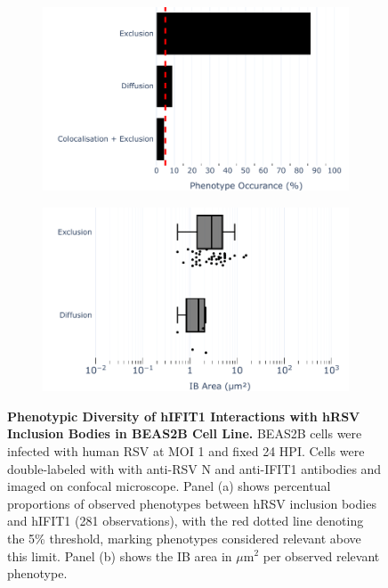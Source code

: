 \begin{figure}
    \begin{subfigure}{0.495\textwidth}
        \caption{}
        \includegraphics[width=1\linewidth]{08. Chapter 3/Figs/02. Infection/01. IFIT1/04. bar_i1_beas2b.pdf} 
    \end{subfigure}
    \begin{subfigure}{0.495\textwidth}
        \caption{}
        \includegraphics[width=1\linewidth]{08. Chapter 3/Figs/02. Infection/01. IFIT1/05. box_i1_beas2b.pdf}
    \end{subfigure}
    \caption[Phenotypic Diversity of hIFIT1 Interactions with hRSV Inclusion Bodies in BEAS2B Cell Line.]{\textbf{Phenotypic Diversity of hIFIT1 Interactions with hRSV Inclusion Bodies in BEAS2B Cell Line.} BEAS2B cells were infected with human RSV at MOI 1 and fixed 24 HPI. Cells were double-labeled with with anti-RSV N and anti-IFIT1 antibodies and imaged on confocal microscope. Panel (a) shows percentual proportions of observed phenotypes between hRSV inclusion bodies and hIFIT1 (281 observations), with the red dotted line denoting the 5\% threshold, marking phenotypes considered relevant above this limit. Panel (b) shows the IB area in \(\mu \mbox{m}^2\) per observed relevant phenotype.}
    \label{fig:Phenotypic Diversity of hIFIT1 Interactions with hRSV Inclusion Bodies in BEAS2B Cell Line}
\end{figure}

